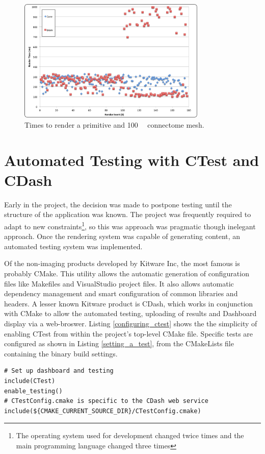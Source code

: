 \documentclass[MSc,paper=a4,pagesize=auto]{icldt}
\begin{document}
\begin{figure}[htbp!]
    \centering
    \includegraphics[width=0.8\textwidth]{resources/render_times}
    \caption{Times to render a primitive and \SI{100}{\mega\byte} connectome mesh.}
    \label{fig:render_times}
\end{figure}



\section{Automated Testing with CTest and CDash}
Early in the project, the decision was made to postpone testing until the structure of the application was known. The project was frequently required to adapt to new constraints\footnote{The operating system used for development changed twice times and the main programming language changed three times}, so this was approach was pragmatic though inelegant approach. Once the rendering system was capable of generating content, an automated testing system was implemented.

Of the non-imaging products developed by Kitware Inc, the most famous is probably CMake. This utility allows the automatic generation of configuration files like Makefiles and VisualStudio project files. It also allows automatic dependency management and smart configuration of common libraries and headers. A lesser known Kitware product is CDash, which works in conjunction with CMake to allow the automated testing, uploading of results and Dashboard display via a web-broswer. Listing \ref{configuring_ctest} shows the the simplicity of enabling CTest from within the project's top-level CMake file. Specific tests are configured as shown in Listing \ref{setting_a_test}, from the CMakeLists file containing the binary build settings.

\begin{lstlisting}[label=configuring_ctest, caption=Enabling CTest in the CMakeLists]
# Set up dashboard and testing
include(CTest)
enable_testing()
# CTestConfig.cmake is specific to the CDash web service
include(${CMAKE_CURRENT_SOURCE_DIR}/CTestConfig.cmake)
\end{lstlisting}
\end{document}
